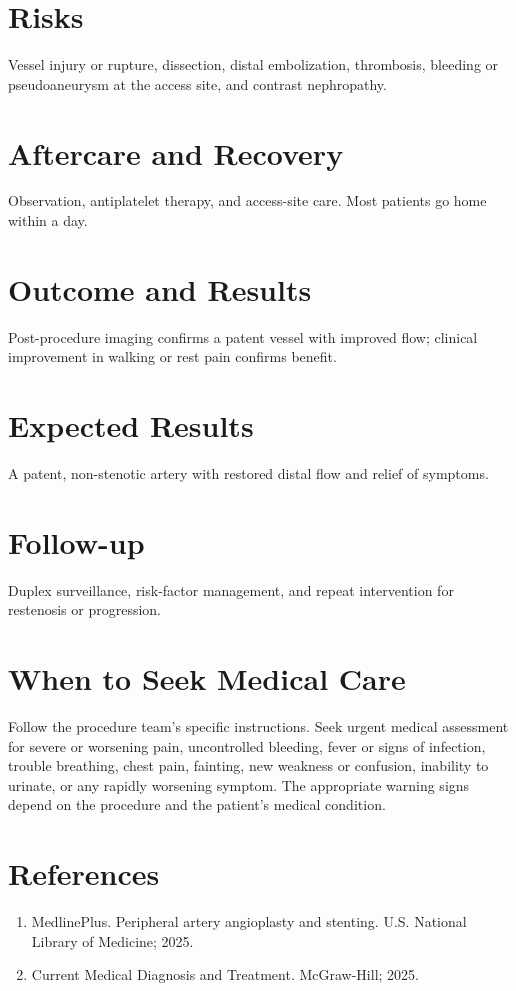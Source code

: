\section*{Risks}
Vessel injury or rupture, dissection, distal embolization, thrombosis, bleeding or pseudoaneurysm at the access site, and contrast nephropathy.

\section*{Aftercare and Recovery}
Observation, antiplatelet therapy, and access-site care. Most patients go home within a day.

\section*{Outcome and Results}
Post-procedure imaging confirms a patent vessel with improved flow; clinical improvement in walking or rest pain confirms benefit.

\section*{Expected Results}
A patent, non-stenotic artery with restored distal flow and relief of symptoms.

\section*{Follow-up}
Duplex surveillance, risk-factor management, and repeat intervention for restenosis or progression.

\section*{When to Seek Medical Care}
Follow the procedure team's specific instructions. Seek urgent medical assessment for severe or worsening pain, uncontrolled bleeding, fever or signs of infection, trouble breathing, chest pain, fainting, new weakness or confusion, inability to urinate, or any rapidly worsening symptom. The appropriate warning signs depend on the procedure and the patient's medical condition.

\section*{References}
\begin{enumerate}
  \item MedlinePlus. Peripheral artery angioplasty and stenting. U.S. National Library of Medicine; 2025.
  \item Current Medical Diagnosis and Treatment. McGraw-Hill; 2025.
\end{enumerate}

\clearpage
